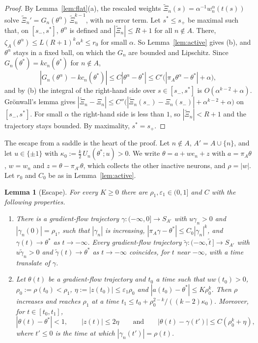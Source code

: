 \documentclass[11pt]{article}
\newtheorem{lemma}{Lemma}
\theoremstyle{definition}
\theoremstyle{remark}
\newcommand{\eps}{\varepsilon}
\begin{document}
\begin{proof}
By Lemma~\ref{lem:flat}(a), the rescaled weights $\tilde\Xi_n(s)=\alpha^{-1}w^\alpha_n(t(s))$ solve $\tilde\Xi_n'=G_n(\theta^\alpha)\,\tilde\Xi_n^{k-1}$, with no error term. Let $s^*\le s_+$ be maximal such that, on $[s_-,s^*]$, $\theta^\alpha$ is defined and $|\tilde\Xi_n|\le R+1$ for all $n\notin A$. There, $\zeta_A(\theta^\alpha)\le L(R+1)^k\alpha^k\le r_0$ for small $\alpha$. So Lemma~\ref{lem:active} gives (b), and $\theta^\alpha$ stays in a fixed ball, on which the $G_n$ are bounded and Lipschitz. Since $G_n(\theta^*)=kc_n(\theta^*)$ for $n\notin A$,
\[
|G_n(\theta^\alpha)-kc_n(\theta^*)|\le C|\theta^\alpha-\theta^*|\le C'\big(|\pi_A\theta^\alpha-\theta^*|+\alpha\big),
\]
and by (b) the integral of the right-hand side over $s\in[s_-,s^*]$ is $O(\alpha^{k-2}+\alpha)$. Grönwall's lemma gives $|\tilde\Xi_n-\Xi_n|\le C''\big(|\tilde\Xi_n(s_-)-\Xi_n(s_-)|+\alpha^{k-2}+\alpha\big)$ on $[s_-,s^*]$. For small $\alpha$ the right-hand side is less than $1$, so $|\tilde\Xi_n|<R+1$ and the trajectory stays bounded. By maximality, $s^*=s_+$.
\end{proof}

The escape from a saddle is the heart of the proof. Let $n\notin A$, $A'=A\cup\{n\}$, and let $u\in\{\pm1\}$ with $\kappa_0:=\frac k2\,U_n(\theta^*;u)>0$. We write $\theta=a+we_n+z$ with $a=\pi_A\theta$, $w=w_n$ and $z=\theta-\pi_{A'}\theta$, which collects the other inactive neurons, and $\rho=|w|$. Let $r_0$ and $C_0$ be as in Lemma~\ref{lem:active}.

\begin{lemma}[Escape]\label{lem:escape}
For every $K\ge0$ there are $\rho_1,\eps_1\in(0,1]$ and $C$ with the following properties.
\begin{enumerate}[label=\textup{(\alph*)},nosep]
\item There is a gradient-flow trajectory $\gamma\colon(-\infty,0]\to S_{A'}$ with $u\gamma_n>0$ and $|\gamma_n(0)|=\rho_1$, such that $|\gamma_n|$ is increasing, $|\pi_A\gamma-\theta^*|\le C_0|\gamma_n|^k$, and $\gamma(t)\to\theta^*$ as $t\to-\infty$. Every gradient-flow trajectory $\tilde\gamma\colon(-\infty,\tilde t\,]\to S_{A'}$ with $u\tilde\gamma_n>0$ and $\tilde\gamma(t)\to\theta^*$ as $t\to-\infty$ coincides, for $t$ near $-\infty$, with a time translate of $\gamma$.
\item Let $\theta(t)$ be a gradient-flow trajectory and $t_0$ a time such that $uw(t_0)>0$, $\rho_0:=\rho(t_0)<\rho_1$, $\eta:=|z(t_0)|\le\eps_1\rho_0$ and $|a(t_0)-\theta^*|\le K\rho_0^k$. Then $\rho$ increases and reaches $\rho_1$ at a time $t_1\le t_0+\rho_0^{2-k}/((k-2)\kappa_0)$. Moreover, for $t\in[t_0,t_1]$,
\[
|\theta(t)-\theta^*|<1,\qquad|z(t)|\le2\eta\qquad\text{and}\qquad|\theta(t)-\gamma(t')|\le C(\rho_0^k+\eta),
\]
where $t'\le0$ is the time at which $|\gamma_n(t')|=\rho(t)$.
\end{enumerate}
\end{lemma}
\end{document}
